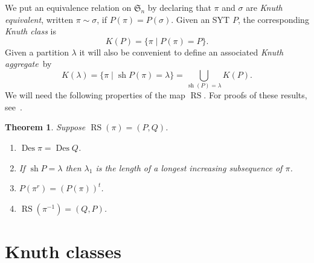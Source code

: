 \documentclass[10pt]{amsart}
\newtheorem{theo}{Theorem}[section]
\DeclareMathOperator{\RS}{RS}
\newcommand{\la}{\lambda}
\newcommand{\si}{\sigma}
\newcommand{\fS}{{\mathfrak S}}
\DeclareMathOperator{\Des}{Des}
\DeclareMathOperator{\sh}{sh}
\begin{document}
We put an equivalence relation on $\fS_n$ by declaring that $\pi$ and $\si$ are \emph{Knuth equivalent}, written $\pi\sim\si$, if $P(\pi)=P(\si)$. Given an SYT $P$, the corresponding \emph{Knuth class} is
\[
K(P) = \{\pi \mid P(\pi)=P\}.
\]
Given a partition $\la$ it will also be convenient to define an associated \emph{Knuth aggregate}~by
\[
K(\la) = \{\pi \mid \sh P(\pi) = \la\} =\bigcup_{\sh(P)=\la} K(P).
\]
We will need the following properties of the map $\RS$. For proofs of these results, see~\cite{sta:ec2}.
\begin{theo}
\label{RS}
Suppose $\RS(\pi)=(P,Q)$.
\begin{enumerate}
\item\label{theo2.2_a} %
$\Des\pi=\Des Q$.
\item\label{theo2.2_b} %
If $\sh P=\la$ then $\la_1$ is the length of a longest increasing subsequence of $\pi$.
\item\label{theo2.2_c} %
$P(\pi^r) = (P(\pi))^t$.
\item\label{theo2.2_d} %
$\RS(\pi^{-1}) = (Q,P)$. %
\end{enumerate}
\end{theo}
\setcounter{section}{4}
\section{Knuth classes}
\label{kc}
\end{document}
